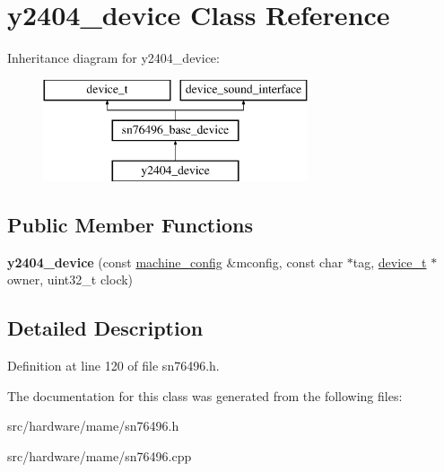 \hypertarget{classy2404__device}{\section{y2404\-\_\-device Class Reference}
\label{classy2404__device}
}
Inheritance diagram for y2404\-\_\-device\-:\begin{figure}[H]
\begin{center}
\leavevmode
\includegraphics[height=3.000000cm]{classy2404__device}
\end{center}
\end{figure}
\subsection*{Public Member Functions}
\begin{DoxyCompactItemize}
\item 
\hypertarget{classy2404__device_aede28d65bdd93c93806cb3ea99222352}{{\bfseries y2404\-\_\-device} (const \hyperlink{structmachine__config}{machine\-\_\-config} \&mconfig, const char $\ast$tag, \hyperlink{classdevice__t}{device\-\_\-t} $\ast$owner, uint32\-\_\-t clock)}\label{classy2404__device_aede28d65bdd93c93806cb3ea99222352}

\end{DoxyCompactItemize}


\subsection{Detailed Description}


Definition at line 120 of file sn76496.\-h.



The documentation for this class was generated from the following files\-:\begin{DoxyCompactItemize}
\item 
src/hardware/mame/sn76496.\-h\item 
src/hardware/mame/sn76496.\-cpp\end{DoxyCompactItemize}

